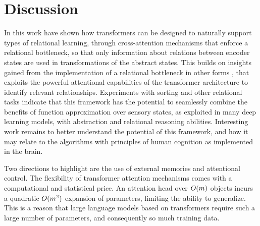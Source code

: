 \section{Discussion}
\label{sec:discuss}



In this work have shown how transformers
can be designed to
%
naturally support types of relational learning, through cross-attention
mechanisms that enforce a relational bottleneck, so that only information about relations between encoder states
are used in transformations of the abstract states.
This builds on insights gained from the implementation of a relational bottleneck in other forms \cite{esbn, kerg2022neural},
that exploits the powerful attentional capabilities of the transformer architecture to identify relevant relationships.
%
Experiments with sorting and other relational tasks indicate that this framework has the potential to seamlessly combine the benefits of function approximation over sensory states, as exploited in many deep learning models, with abstraction and relational reasoning abilities. Interesting
work remains to better understand the potential of this framework, and
how it may relate to the algorithms with principles of human cognition as implemented in the brain.

Two directions to highlight are the use of external memories and attentional control. The flexibility of transformer attention mechanisms comes with a computational and statistical price. An attention head over 
$O(m)$ objects incurs a quadratic $O(m^2)$ expansion of parameters, limiting the ability to generalize. This is a reason that large language models based on transformers require such a large number of parameters, and consequently so much training data. 

